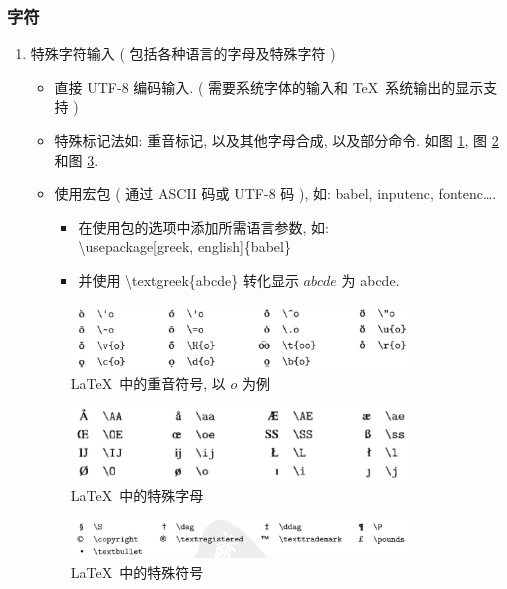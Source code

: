 \documentclass[UTF8]{ctexart}
\begin{document}
        \subsubsection{字符}
            \begin{enumerate}

                \item 特殊字符输入 ( 包括各种语言的字母及特殊字符 )
                \begin{itemize}
                    \item 直接 UTF-8 编码输入. ( 需要系统字体的输入和 \TeX\ 系统输出的显示支持 )
                    \item 特殊标记法如: 重音标记, 以及其他字母合成, 以及部分命令. 如图 \ref{fig:zhongyin}, 图 \ref{fig:teshu} 和图 \ref{fig:teshufuhao}. 
                    \item 使用宏包 ( 通过 ASCII 码或 UTF-8 码 ), 如: babel, inputenc, fontenc\dots. 

                    \begin{itemize}
                        \item 在使用包的选项中添加所需语言参数, 如: \\\textbackslash usepackage[greek, english]\{babel\}
                        \item 并使用 \textbackslash textgreek\{abcde\} 转化显示 $abcde$ 为 \textgreek{abcde}. 
                    \end{itemize}
                \end{itemize}

                \begin{figure}[ht]
                    \centering
                    \includegraphics[width=9cm]{figures/zhongyin.png}
                    \caption{\LaTeX\ 中的重音符号, 以 $o$ 为例}
                    \label{fig:zhongyin}
                \end{figure}
                \begin{figure}[ht]
                    \centering
                    \includegraphics[width=9cm]{figures/teshu.PNG}
                    \caption{\LaTeX\ 中的特殊字母}
                    \label{fig:teshu}
                \end{figure}
                \begin{figure}[ht]
                    \centering
                    \includegraphics[width=9cm]{figures/teshufuhao.PNG}
                    \caption{\LaTeX\ 中的特殊符号}
                    \label{fig:teshufuhao}
                \end{figure}


\end{enumerate}
\end{document}
